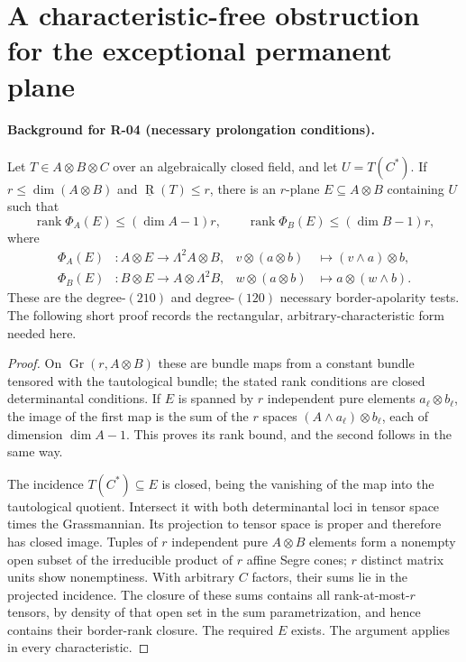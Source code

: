 \section{A characteristic-free obstruction for the exceptional permanent plane}
\label{sec:permanent-apolar}

\paragraph{Background for R-04 (necessary prolongation conditions).}
Let $T\in A\otimes B\otimes C$ over an algebraically closed field,
and let $U=T(C^*)$. If $r\leq\dim(A\otimes B)$ and
$\underline{\operatorname R}(T)\leq r$, there is an $r$-plane
$E\subseteq A\otimes B$ containing $U$ such that
\[
 \operatorname{rank}\Phi_A(E)\leq(\dim A-1)r,\qquad
 \operatorname{rank}\Phi_B(E)\leq(\dim B-1)r,
\]
where
\begin{align*}
 \Phi_A(E)&:A\otimes E\longrightarrow\Lambda^2A\otimes B,
 &v\otimes(a\otimes b)&\longmapsto(v\wedge a)\otimes b,\\
 \Phi_B(E)&:B\otimes E\longrightarrow A\otimes\Lambda^2B,
 &w\otimes(a\otimes b)&\longmapsto a\otimes(w\wedge b).
\end{align*}
These are the degree-$(210)$ and degree-$(120)$ necessary
border-apolarity tests. The following short proof records the
rectangular, arbitrary-characteristic form needed here.

\begin{proof}
On $\operatorname{Gr}(r,A\otimes B)$ these are bundle maps
from a constant bundle tensored with the tautological bundle;
the stated rank conditions are closed determinantal conditions.
If $E$ is spanned by $r$ independent pure elements
$a_\ell\otimes b_\ell$, the image of the first map is the sum
of the $r$ spaces $(A\wedge a_\ell)\otimes b_\ell$, each of
dimension $\dim A-1$. This proves its rank bound, and the
second follows in the same way.

The incidence $T(C^*)\subseteq E$ is closed, being the
vanishing of the map into the tautological quotient. Intersect
it with both determinantal loci in tensor space times the
Grassmannian. Its projection to tensor space is proper and
therefore has closed image. Tuples of $r$ independent pure
$A\otimes B$ elements form a nonempty open subset of the
irreducible product of $r$ affine Segre cones; $r$ distinct
matrix units show nonemptiness. With arbitrary $C$ factors,
their sums lie in the projected incidence. The closure of
these sums contains all rank-at-most-$r$ tensors, by density
of that open set in the sum parametrization, and hence
contains their border-rank closure. The required $E$ exists.
The argument applies in every characteristic.
\end{proof}


